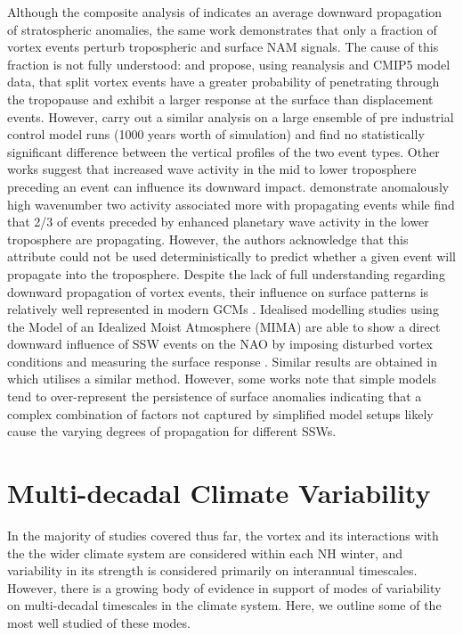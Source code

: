 Although the composite analysis of \cite{baldwinStratospheric2001a} indicates an average downward propagation of stratospheric anomalies, the same work demonstrates that only a fraction of vortex events perturb tropospheric and surface NAM signals. The cause of this fraction is not fully understood: \cite{Mitchell2011} and \cite{Seviour2016} propose, using reanalysis and CMIP5 model data, that split vortex events have a greater probability of penetrating through the tropopause and exhibit a larger response at the surface than displacement events. However, \cite{Maycock2015} carry out a similar analysis on a large ensemble of pre industrial control model runs (1000 years worth of simulation) and find no statistically significant difference between the vertical profiles of the two event types. Other works suggest that increased wave activity in the mid to lower troposphere preceding an event can influence its downward impact. \cite{Nakagawa2006} demonstrate anomalously high wavenumber two activity associated more with propagating events while \cite{White2019} find that 2/3 of events preceded by enhanced planetary wave activity in the lower troposphere are propagating. However, the authors acknowledge that this attribute could not be used deterministically to predict whether a given event will propagate into the troposphere. Despite the lack of full understanding regarding downward propagation of vortex events, their influence on surface patterns is relatively well represented in modern GCMs \cite{baldwinSudden2021b}. Idealised modelling studies using the Model of an Idealized Moist Atmosphere (MIMA)  are able to show a direct downward influence of SSW events on the NAO by imposing disturbed vortex conditions and measuring the surface response \citep{whiteGeneric2020b}. Similar results are obtained in \cite{gerberStratospheric2009b} which utilises a similar method. However, some works note that simple models tend to over-represent the persistence of surface anomalies \citep{gerberAnnular2008b, gerberTesting2008b} indicating that a complex combination of factors not captured by simplified model setups likely cause the varying degrees of propagation for different SSWs. 

\section{Multi-decadal Climate Variability}
\label{sec:multi-decadal_background}
In the majority of studies covered thus far, the vortex and its interactions with the the wider climate system are considered within each NH winter, and variability in its strength is considered primarily on interannual timescales. However, there is a growing body of evidence in support of modes of variability on multi-decadal timescales in the climate system. Here, we outline some of the most well studied of these modes. 

